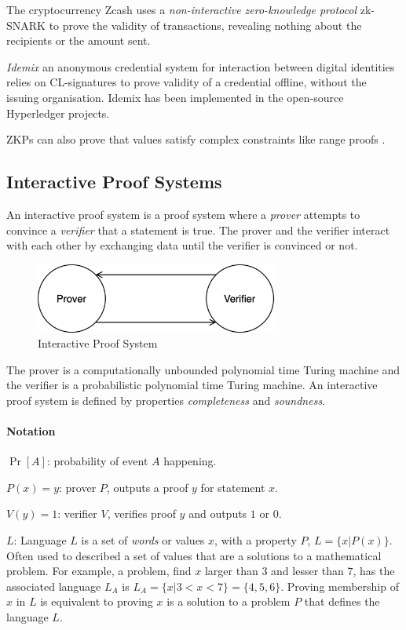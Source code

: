 The cryptocurrency Zcash uses a \textit{non-interactive zero-knowledge protocol} zk-SNARK \cite{bowe2018multi} to prove the validity of transactions, revealing nothing about the recipients or the amount sent.

\textit{Idemix} \cite{camenisch2002design} an anonymous credential system for interaction between digital identities relies on CL-signatures \cite{camenisch2001efficient} to prove validity of a credential offline, without the issuing organisation.
Idemix has been implemented in the open-source Hyperledger projects.

ZKPs can also prove that values satisfy complex constraints like range proofs \cite{camenisch2008efficient}.

\newpage
\subsection{Interactive Proof Systems}
\label{section:interactive-proof-systems}
An interactive proof system is a proof system where a \textit{prover} attempts to convince a \textit{verifier} that a statement is true.
The prover and the verifier interact with each other by exchanging data until the verifier is convinced or not.

\begin{figure}[h]
	\centering
	\includegraphics[width=8cm]{images/interactive-proof-system}
	\caption{Interactive Proof System}
	\label{fig:interactive-proof-system}
\end{figure}

The prover is a computationally unbounded polynomial time Turing machine and the verifier is a probabilistic polynomial time Turing machine.
An interactive proof system is defined by properties \textit{completeness} and \textit{soundness}.

\paragraph{Notation}
\begin{description}
	\item $\Pr[A]$: probability of event $A$ happening.
	\item $P(x) = y$: prover $P$, outputs a proof $y$ for statement $x$.
	\item $V(y) = 1$: verifier $V$, verifies proof $y$ and outputs $1$ or $0$.
	\item $L$: Language $L$ is a set of \textit{words} or values $x$, with a property $P$, $L = \{x | P(x)\}$. Often used to described a set of values that are a solutions to a mathematical problem. For example, a problem, find $x$ larger than $3$ and lesser than $7$, has the associated language $L_A$ is $L_A = \{x| 3<x<7\} = \{4,5,6\}$. Proving membership of $x$ in $L$ is equivalent to proving $x$ is a solution to a problem $P$ that defines the language $L$.
\end{description}

